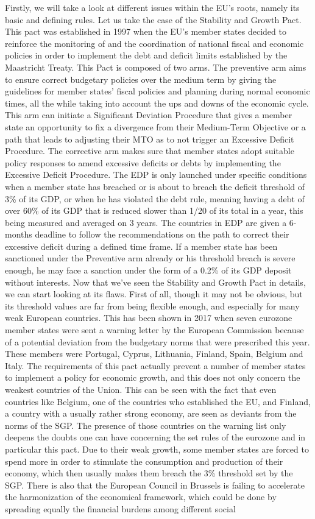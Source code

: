 \documentclass[12pt]{article}
\begin{document}
Firstly, we will take a look at different issues within the EU’s roots, namely its basic and defining rules. Let us take the case of the Stability and Growth Pact. This pact was established in 1997 when the EU’s member states decided to reinforce the monitoring of and the coordination of national fiscal and economic policies in order to implement the debt and deficit limits established by the Maastricht Treaty. This Pact is composed of two arms. The preventive arm aims to ensure correct budgetary policies over the medium term by giving the guidelines for member states' fiscal policies and planning during normal economic times, all the while taking into account the ups and downs of the economic cycle. This arm can initiate a Significant Deviation Procedure that gives a member state an opportunity to fix a divergence from their Medium-Term Objective or a path that leads to adjusting their MTO as to not trigger an Excessive Deficit Procedure. The corrective arm makes sure that member states adopt suitable policy responses to amend excessive deficits or debts by implementing the Excessive Deficit Procedure. The EDP is only launched under specific conditions when a member state has breached or is about to breach the deficit threshold of 3\% of its GDP, or when he has violated the debt rule, meaning having a debt of over 60\% of its GDP that is reduced slower than 1/20 of its total in a year, this being measured and averaged on 3 years. The countries in EDP are given a 6-months deadline to follow the recommendations on the path to correct their excessive deficit during a defined time frame. If a member state has been sanctioned under the Preventive arm already or his threshold breach is severe enough, he may face a sanction under the form of a 0.2\% of its GDP deposit without interests. Now that we’ve seen the Stability and Growth Pact in details, we can start looking at its flaws. First of all, though it may not be obvious, but its threshold values are far from being flexible enough, and especially for many weak European countries. This has been shown in 2017 when seven eurozone member states were sent a warning letter by the European Commission because of a potential deviation from the budgetary norms that were prescribed this year. These members were Portugal, Cyprus, Lithuania, Finland, Spain, Belgium and Italy. The requirements of this pact actually prevent a number of member states to implement a policy for economic growth, and this does not only concern the weakest countries of the Union. This can be seen with the fact that even countries like Belgium, one of the countries who established the EU, and Finland, a country with a usually rather strong economy, are seen as deviants from the norms of the SGP. The presence of those countries on the warning list only deepens the doubts one can have concerning the set rules of the eurozone and in particular this pact. Due to their weak growth, some member states are forced to spend more in order to stimulate the consumption and production of their economy, which then usually makes them breach the 3\% threshold set by the SGP. There is also that the European Council in Brussels is failing to accelerate the harmonization of the economical framework, which could be done by spreading equally the financial burdens among different social 
\end{document}
